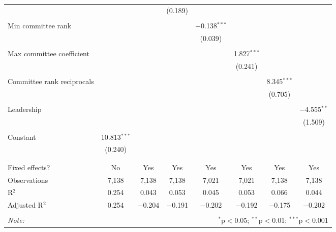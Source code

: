 \documentclass{article}
\begin{document}
\begin{table}[!htbp]
{{\begin{tabular}{@{\extracolsep{5pt}}lccccccc}
          &  &  & (0.189) &  &  &  &  \\ 
          & & & & & & & \\ 
         Min committee rank &  &  &  & $-$0.138$^{***}$ &  &  &  \\ 
          &  &  &  & (0.039) &  &  &  \\ 
          & & & & & & & \\ 
         Max committee coefficient &  &  &  &  & 1.827$^{***}$ &  &  \\ 
          &  &  &  &  & (0.241) &  &  \\ 
          & & & & & & & \\ 
         Committee rank reciprocals &  &  &  &  &  & 8.345$^{***}$ &  \\ 
          &  &  &  &  &  & (0.705) &  \\ 
          & & & & & & & \\ 
         Leadership &  &  &  &  &  &  & $-$4.555$^{**}$ \\ 
          &  &  &  &  &  &  & (1.509) \\ 
          & & & & & & & \\ 
         Constant & 10.813$^{***}$ &  &  &  &  &  &  \\ 
          & (0.240) &  &  &  &  &  &  \\ 
          & & & & & & & \\ 
        \hline \\[-1.8ex] 
        Fixed effects? & No & Yes & Yes & Yes & Yes & Yes & Yes \\ 
        Observations & 7,138 & 7,138 & 7,138 & 7,021 & 7,021 & 7,138 & 7,138 \\ 
        R$^{2}$ & 0.254 & 0.043 & 0.053 & 0.045 & 0.053 & 0.066 & 0.044 \\ 
        Adjusted R$^{2}$ & 0.254 & $-$0.204 & $-$0.191 & $-$0.202 & $-$0.192 & $-$0.175 & $-$0.202 \\ 
        \hline 
        \hline \\[-1.8ex] 
        \textit{Note:}  & \multicolumn{7}{r}{$^{*}$p$<$0.05; $^{**}$p$<$0.01; $^{***}$p$<$0.001} \\ 
        \end{tabular} 
    }}
  \end{table} 
\end{document}
